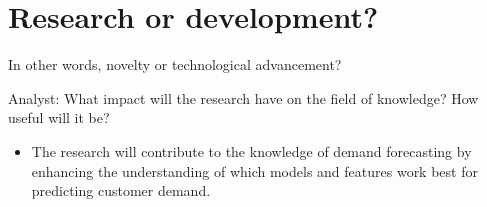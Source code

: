 \documentclass[12pt]{article}
\begin{document}
\section{Research or development?}
In other words, novelty or technological advancement?

{Analyst:} What impact will the research have on the field of knowledge? How useful will it be?
\begin{itemize}
    \item The research will contribute to the knowledge of demand forecasting by enhancing the understanding of which models and features work best for predicting customer demand.
\end{itemize}
\end{document}
